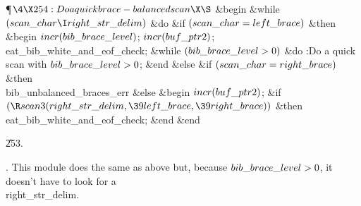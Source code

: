 \Y\P$\4\X254:Do a quick brace-balanced scan\X\S$\6
\&{begin} \&{while} $(\\{scan\_char}\I\\{right\_str\_delim})$ \1\&{do}%
\6
\&{if} $(\\{scan\_char}=\\{left\_brace})$ \1\&{then}\6
\&{begin} $\\{incr}(\\{bib\_brace\_level})$;\5
$\\{incr}(\\{buf\_ptr2})$;\6
\\{eat\_bib\_white\_and\_eof\_check};\6
\&{while} $(\\{bib\_brace\_level}>0)$ \1\&{do}\5
:Do a quick scan with $\\{bib\_brace\_level}>0$\X;\2\6
\&{end}\6
\4\&{else} \&{if} $(\\{scan\_char}=\\{right\_brace})$ \1\&{then}\5
\\{bib\_unbalanced\_braces\_err}\6
\4\&{else} \&{begin} $\\{incr}(\\{buf\_ptr2})$;\6
\&{if} $(\R\\{scan3}(\\{right\_str\_delim},\39\\{left\_brace},\39\\{right%
\_brace}))$ \1\&{then}\5
\\{eat\_bib\_white\_and\_eof\_check};\2\6
\&{end}\2\2\2\6
\&{end}\par
\U253.\fi

.
This module does the same as above but, because $\\{bib\_brace\_level}>0$, it
doesn't have to look for a \\{right\_str\_delim}.

